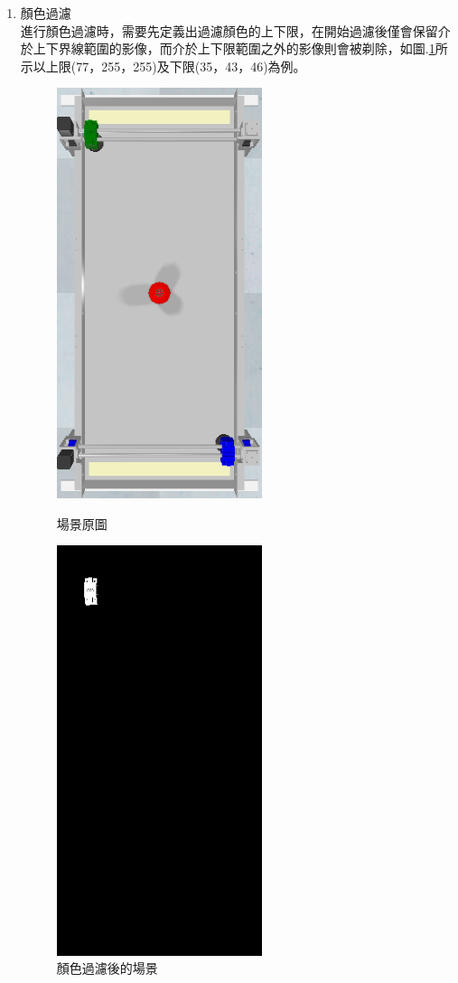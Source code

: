\documentclass[14pt,a4paper]{report}  %
\begin{document}
\begin{enumerate}
\item 顏色過濾\\
進行顏色過濾時，需要先定義出過濾顏色的上下限，在開始過濾後僅會保留介於上下界線範圍的影像，而介於上下限範圍之外的影像則會被剃除，如圖.\ref{filter}所示以上限(77，255，255)及下限(35，43，46)為例。\\
\begin{figure}[hbt!]
\center
\begin{minipage}[t]{0.48\textwidth}
\center
\includegraphics[width=6cm]{origin}
\caption{\Large 場景原圖}
\label{origin}
\end{minipage}
\begin{minipage}[t]{0.48\textwidth}
\center
\includegraphics[width=6cm]{filter}
\caption{\Large 顏色過濾後的場景}
\label{filter}
\end{minipage}
\end{figure}



\end{enumerate}
\end{document}
